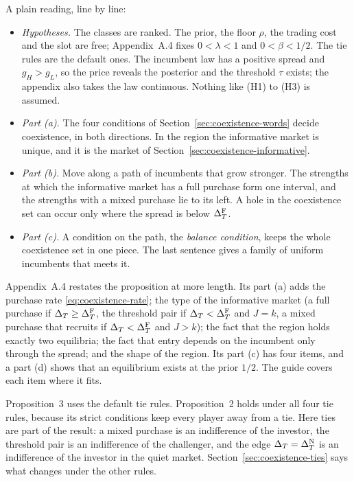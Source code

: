 A plain reading, line by line:
\begin{itemize}
\item \emph{Hypotheses.} The classes are ranked. The prior, the floor \(\rho\), the trading cost and the slot are
free; Appendix~A.4 fixes \(0<\lambda<1\) and \(0<\beta<1/2\). The tie rules are the default ones. The incumbent law
has a positive spread and \(g_H>g_L\), so the price reveals the posterior and the threshold \(\tau\) exists; the
appendix also takes the law continuous. Nothing like (H1) to (H3) is assumed.
\item \emph{Part (a).} The four conditions of Section~\ref{sec:coexistence-words} decide coexistence, in both
directions. In the region the informative market is unique, and it is the market of
Section~\ref{sec:coexistence-informative}.
\item \emph{Part (b).} Move along a path of incumbents that grow stronger. The strengths at which the informative
market has a full purchase form one interval, and the strengths with a mixed purchase lie to its left. A hole in the
coexistence set can occur only where the spread is below \(\Delta_T^{\rm F}\).
\item \emph{Part (c).} A condition on the path, the \emph{balance condition}, keeps the whole coexistence set in one
piece. The last sentence gives a family of uniform incumbents that meets it.
\end{itemize}

Appendix~A.4 restates the proposition at more length. Its part (a) adds the purchase rate
\eqref{eq:coexistence-rate}; the type of the informative market (a full purchase if \(\Delta_T\ge\Delta_T^{\rm F}\), the
threshold pair if \(\Delta_T<\Delta_T^{\rm F}\) and \(J=k\), a mixed purchase that recruits if \(\Delta_T<\Delta_T^{\rm F}\) and
\(J>k\)); the fact that the region holds exactly two equilibria; the fact that entry depends on the incumbent only
through the spread; and the shape of the region. Its part (c) has four items, and a part (d) shows that an
equilibrium exists at the prior \(1/2\). The guide covers each item where it fits.

\begin{watchout}
Proposition~3 uses the default tie rules. Proposition~2 holds under all four tie rules, because its strict
conditions keep every player away from a tie. Here ties are part of the result: a mixed purchase is an indifference
of the investor, the threshold pair is an indifference of the challenger, and the edge \(\Delta_T=\Delta_T^{\rm N}\) is an
indifference of the investor in the quiet market. Section~\ref{sec:coexistence-ties} says what changes under the other
rules.
\end{watchout}

